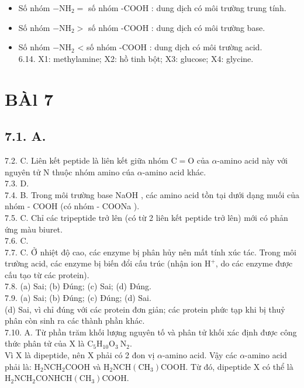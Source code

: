 \documentclass[10pt]{article}
\begin{document}
\begin{itemize}
  \item Số nhóm $-\mathrm{NH}_{2}=$ số nhóm -COOH : dung dịch có môi trường trung tính.
  \item Số nhóm $-\mathrm{NH}_{2}>$ số nhóm -COOH : dung dịch có môi trường base.
  \item Số nhóm $-\mathrm{NH}_{2}$ < số nhóm -COOH : dung dịch có môi trường acid.\\
6.14. X1: methylamine; X2: hồ tinh bột; X3: glucose; X4: glycine.
\end{itemize}

\section*{BÀl 7}
\subsection*{7.1. A.}
7.2. C. Liên kết peptide là liên kết giữa nhóm $\mathrm{C}=\mathrm{O}$ của $\alpha$-amino acid này với nguyên tử N thuộc nhóm amino cúa $\alpha$-amino acid khác.\\
7.3. D.\\
7.4. B. Trong môi trường base NaOH , các amino acid tồn tại dưới dạng muối của nhóm - COOH (có nhóm - COONa ).\\
7.5. C. Chỉ các tripeptide trở lên (có từ 2 liên kết peptide trở lên) mới có phản ứng màu biuret.\\
7.6. C.\\
7.7. C. Ở nhiệt độ cao, các enzyme bị phân hủy nên mất tính xúc tác. Trong môi trường acid, các enzyme bị biến đổi cấu trúc (nhận ion $\mathrm{H}^{+}$, do các enzyme được cấu tạo từ các protein).\\
7.8. (a) Sai; (b) Đúng; (c) Sai; (d) Đúng.\\
7.9. (a) Sai; (b) Đúng; (c) Đúng; (d) Sai.\\
(d) Sai, vì chỉ đúng với các protein đơn giản; các protein phức tạp khi bị thuỷ phân còn sinh ra các thành phần khác.\\
7.10. A. Từ phần trăm khối lượng nguyên tố và phân tử khối xác định được công thức phân tử của X là $\mathrm{C}_{5} \mathrm{H}_{10} \mathrm{O}_{3} \mathrm{~N}_{2}$.\\
Vì X là dipeptide, nên X phải có 2 đon vị $\alpha$-amino acid. Vậy các $\alpha$-amino acid phải là: $\mathrm{H}_{2} \mathrm{NCH}_{2} \mathrm{COOH}$ và $\mathrm{H}_{2} \mathrm{NCH}\left(\mathrm{CH}_{3}\right) \mathrm{COOH}$. Từ đó, dipeptide X có thể là $\mathrm{H}_{2} \mathrm{NCH}_{2} \mathrm{CONHCH}\left(\mathrm{CH}_{3}\right) \mathrm{COOH}$.
\end{document}
